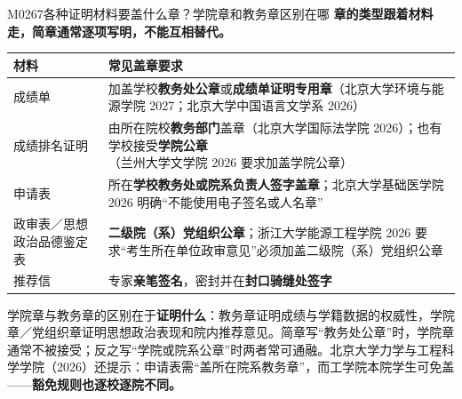 \begin{qa}{M0267}{各种证明材料要盖什么章？学院章和教务章区别在哪}
\textbf{章的类型跟着材料走，简章通常逐项写明，不能互相替代。}

\par\vspace{2pt}\nobreak\begin{center}\footnotesize
\begin{tabularx}{\textwidth}{>{\raggedright\arraybackslash}X>{\raggedright\arraybackslash}X}
\toprule
\textbf{材料} & \textbf{常见盖章要求} \\ \midrule
成绩单 & 加盖学校\textbf{教务处公章}或\textbf{成绩单证明专用章}（北京大学环境与能源学院 2027；北京大学中国语言文学系 2026） \\
成绩排名证明 & 由所在院校\textbf{教务部门}盖章（北京大学国际法学院 2026）；也有学校接受\textbf{学院公章}（兰州大学文学院 2026 要求加盖学院公章） \\
申请表 & 所在\textbf{学校教务处或院系负责人签字盖章}；北京大学基础医学院 2026 明确“不能使用电子签名或人名章” \\
政审表／思想政治品德鉴定表 & \textbf{二级院（系）党组织公章}；浙江大学能源工程学院 2026 要求“考生所在单位政审意见”必须加盖二级院（系）党组织公章 \\
推荐信 & 专家\textbf{亲笔签名}，密封并在\textbf{封口骑缝处签字} \\
\bottomrule
\end{tabularx}
\end{center}\vspace{2pt}\par

学院章与教务章的区别在于\textbf{证明什么}：教务章证明成绩与学籍数据的权威性，学院章／党组织章证明思想政治表现和院内推荐意见。简章写“教务处公章”时，学院章通常不被接受；反之写“学院或院系公章”时两者常可通融。北京大学力学与工程科学学院（2026）还提示：申请表需“盖所在院系教务章”，而工学院本院学生可免盖——\textbf{豁免规则也逐校逐院不同。}
\end{qa}

